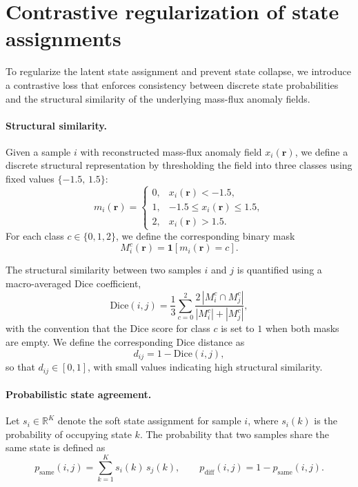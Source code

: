 \documentclass[
    aps,
    prl,
    reprint,
    superscriptaddress,
    amsmath,amssymb,
    nofootinbib,
    floatfix
]{revtex4-2}
\begin{document}
\section{Contrastive regularization of state assignments}

To regularize the latent state assignment and prevent state collapse, we introduce a contrastive loss that enforces consistency between discrete state probabilities and the structural similarity of the underlying mass-flux anomaly fields.

\paragraph{Structural similarity.}
Given a sample $i$ with reconstructed mass-flux anomaly field $x_i(\mathbf{r})$, we define a discrete structural representation by thresholding the field into three classes using fixed values $\{-1.5,\,1.5\}$:
\[
m_i(\mathbf{r}) =
\begin{cases}
0, & x_i(\mathbf{r}) < -1.5, \\
1, & -1.5 \le x_i(\mathbf{r}) \le 1.5, \\
2, & x_i(\mathbf{r}) > 1.5.
\end{cases}
\]
For each class $c \in \{0,1,2\}$, we define the corresponding binary mask
\[
M_i^c(\mathbf{r}) = \mathbf{1}\!\left[m_i(\mathbf{r}) = c\right].
\]

The structural similarity between two samples $i$ and $j$ is quantified using a macro-averaged Dice coefficient,
\[
\mathrm{Dice}(i,j)
=
\frac{1}{3}
\sum_{c=0}^{2}
\frac{2\,|M_i^c \cap M_j^c|}{|M_i^c| + |M_j^c|},
\]
with the convention that the Dice score for class $c$ is set to $1$ when both masks are empty. We define the corresponding Dice distance as
\[
d_{ij} = 1 - \mathrm{Dice}(i,j),
\]
so that $d_{ij} \in [0,1]$, with small values indicating high structural similarity.

\paragraph{Probabilistic state agreement.}
Let $s_i \in \mathbb{R}^K$ denote the soft state assignment for sample $i$, where $s_i(k)$ is the probability of occupying state $k$. The probability that two samples share the same state is defined as
\[
p_{\mathrm{same}}(i,j) = \sum_{k=1}^K s_i(k)\, s_j(k),
\qquad
p_{\mathrm{diff}}(i,j) = 1 - p_{\mathrm{same}}(i,j).
\]
\end{document}
